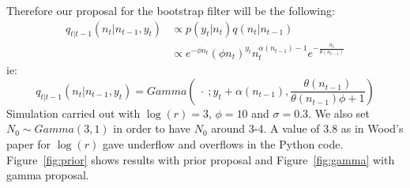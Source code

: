 \documentclass{article}
\begin{document}
Therefore our proposal for the bootstrap filter will be the following:
\begin{equation*}
\begin{split}
q_{t|t-1}(n_t|n_{t-1}, y_t) & \propto  p(y_t|n_t)q(n_t|n_{t-1}) \\
& \propto e^{-\phi n_t}(\phi n_t)^{y_t}n_t^{\alpha(n_{t-1})-1}e^{-\frac{n_t}{\theta(n_{t-1})}}
\end{split}
\end{equation*}
ie:
\begin{equation*}
q_{t|t-1}(n_t|n_{t-1}, y_t) = Gamma(\ \cdot \ ; y_t+\alpha(n_{t-1}), \frac{\theta(n_{t-1})}{\theta(n_{t-1})\phi + 1})\end{equation*}
Simulation carried out with $\log(r)=3$, $\phi=10$ and $\sigma=0.3$. We also set $N_0 \sim Gamma(3,1)$ in order to have $N_0$ around 3-4. A value of 3.8 as in Wood's paper for $\log(r)$ gave underflow and overflows in the Python code. Figure~\ref{fig:prior} shows results with prior proposal and Figure~\ref{fig:gamma} with gamma proposal.
\end{document}
